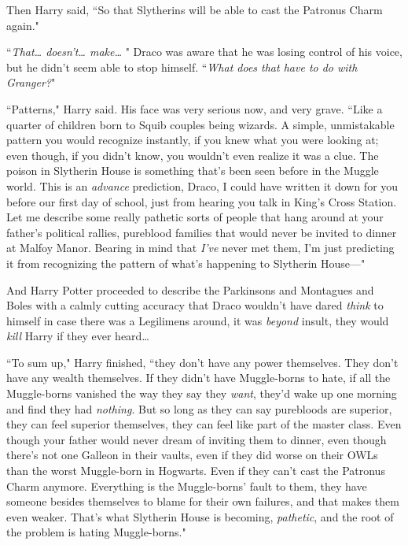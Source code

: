 Then Harry said, ``So that Slytherins will be able to cast the Patronus Charm again."

``\emph{That{\ldots} doesn't{\ldots} make{\ldots} }" Draco was aware that he was losing control of his voice, but he didn't seem able to stop himself. ``\emph{What does that have to do with Granger?}"

``Patterns," Harry said. His face was very serious now, and very grave. ``Like a quarter of children born to Squib couples being wizards. A simple, unmistakable pattern you would recognize instantly, if you knew what you were looking at; even though, if you didn't know, you wouldn't even realize it was a clue. The poison in Slytherin House is something that's been seen before in the Muggle world. This is an \emph{advance} prediction, Draco, I could have written it down for you before our first day of school, just from hearing you talk in King's Cross Station. Let me describe some really pathetic sorts of people that hang around at your father's political rallies, pureblood families that would never be invited to dinner at Malfoy Manor. Bearing in mind that \emph{I've} never met them, I'm just predicting it from recognizing the pattern of what's happening to Slytherin House—"

And Harry Potter proceeded to describe the Parkinsons and Montagues and Boles with a calmly cutting accuracy that Draco wouldn't have dared \emph{think} to himself in case there was a Legilimens around, it was \emph{beyond} insult, they would \emph{kill} Harry if they ever heard{\ldots}

``To sum up," Harry finished, ``they don't have any power themselves. They don't have any wealth themselves. If they didn't have Muggle-borns to hate, if all the Muggle-borns vanished the way they say they \emph{want}, they'd wake up one morning and find they had \emph{nothing}. But so long as they can say purebloods are superior, they can feel superior themselves, they can feel like part of the master class. Even though your father would never dream of inviting them to dinner, even though there's not one Galleon in their vaults, even if they did worse on their OWLs than the worst Muggle-born in Hogwarts. Even if they can't cast the Patronus Charm anymore. Everything is the Muggle-borns' fault to them, they have someone besides themselves to blame for their own failures, and that makes them even weaker. That's what Slytherin House is becoming, \emph{pathetic}, and the root of the problem is hating Muggle-borns."

